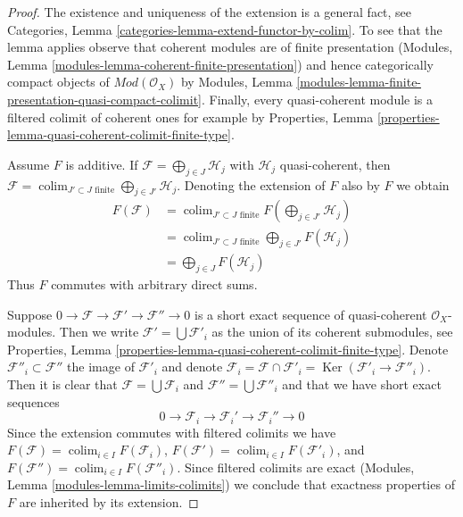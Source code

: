 \documentclass{stacks-project}
\theoremstyle{plain}
\theoremstyle{definition}
\theoremstyle{remark}
\numberwithin{equation}{subsection}
\def\colim{\mathop{\mathrm{colim}}\nolimits}
\def\Ker{\mathop{\mathrm{Ker}}}
\begin{document}
\begin{proof}
The existence and uniqueness of the extension is a general fact, see
Categories, Lemma \ref{categories-lemma-extend-functor-by-colim}.
To see that the lemma applies observe that coherent modules
are of finite presentation
(Modules, Lemma \ref{modules-lemma-coherent-finite-presentation}) and hence
categorically compact objects of $\textit{Mod}(\mathcal{O}_X)$ by
Modules, Lemma \ref{modules-lemma-finite-presentation-quasi-compact-colimit}.
Finally, every quasi-coherent module is a filtered colimit
of coherent ones for example by
Properties, Lemma \ref{properties-lemma-quasi-coherent-colimit-finite-type}.

\medskip\noindent
Assume $F$ is additive. If $\mathcal{F} = \bigoplus_{j \in J} \mathcal{H}_j$
with $\mathcal{H}_j$ quasi-coherent, then
$\mathcal{F} = \colim_{J' \subset J\text{ finite}}
\bigoplus_{j \in J'} \mathcal{H}_j$.
Denoting the extension of $F$ also by $F$ we obtain
\begin{align*}
F(\mathcal{F})
& =
\colim_{J' \subset J\text{ finite}}
F(\bigoplus\nolimits_{j \in J'} \mathcal{H}_j) \\
& =
\colim_{J' \subset J\text{ finite}}
\bigoplus\nolimits_{j \in J'} F(\mathcal{H}_j) \\
& =
\bigoplus\nolimits_{j \in J} F(\mathcal{H}_j)
\end{align*}
Thus $F$ commutes with arbitrary direct sums.

\medskip\noindent
Suppose $0 \to \mathcal{F} \to \mathcal{F}' \to \mathcal{F}'' \to 0$
is a short exact sequence of quasi-coherent $\mathcal{O}_X$-modules.
Then we write $\mathcal{F}' = \bigcup \mathcal{F}'_i$ as the
union of its coherent submodules, see
Properties, Lemma \ref{properties-lemma-quasi-coherent-colimit-finite-type}.
Denote $\mathcal{F}''_i \subset \mathcal{F}''$ the image of $\mathcal{F}'_i$
and denote $\mathcal{F}_i = \mathcal{F} \cap \mathcal{F}'_i =
\Ker(\mathcal{F}'_i \to \mathcal{F}''_i)$. Then it is clear that
$\mathcal{F} = \bigcup \mathcal{F}_i$ and
$\mathcal{F}'' = \bigcup \mathcal{F}''_i$
and that we have short exact sequences
$$
0 \to \mathcal{F}_i \to \mathcal{F}_i' \to \mathcal{F}_i'' \to 0
$$
Since the extension commutes with filtered colimits we have
$F(\mathcal{F}) = \colim_{i \in I} F(\mathcal{F}_i)$,
$F(\mathcal{F}') = \colim_{i \in I} F(\mathcal{F}'_i)$, and
$F(\mathcal{F}'') = \colim_{i \in I} F(\mathcal{F}''_i)$.
Since filtered colimits are exact
(Modules, Lemma \ref{modules-lemma-limits-colimits}) we
conclude that exactness properties of $F$ are inherited by
its extension.
\end{proof}
\end{document}
